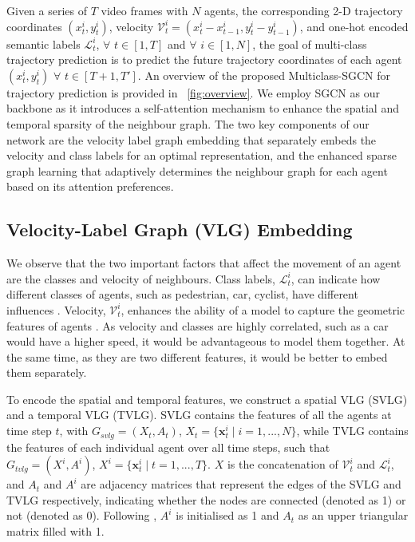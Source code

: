 \documentclass{article}
\begin{document}
Given a series of ${T}$ video frames with $N$ agents, the corresponding 2-D trajectory coordinates $(x_{t}^{i}, y_{t}^{i})$, velocity $\mathcal{V}_{t}^{i} = (x_{t}^{i} - x_{t-1}^{i}, y_{t}^{i} - y_{t-1}^{i})$, and one-hot encoded semantic labels $\mathcal{L}_{t}^{i}$, $\forall$ $t\in [1,T]$ and $\forall$ $i\in[1,N]$, the goal of multi-class trajectory prediction is to predict the future trajectory coordinates of each agent $(x_{t}^{i}, y_{t}^{i})$ $\forall$ $t\in [T+1,T']$. An overview of the proposed Multiclass-SGCN for trajectory prediction is provided in \figurename~\ref{fig:overview}. We employ SGCN \cite{shi2021sgcn} as our backbone as it introduces a self-attention mechanism to enhance the spatial and temporal sparsity of the neighbour graph. The two key components of our network are the velocity label graph embedding that separately embeds the velocity and class labels for an optimal representation, and the enhanced sparse graph learning that adaptively determines the neighbour graph for each agent based on its attention preferences.














\subsection{Velocity-Label Graph (VLG) Embedding}
\label{sec:embedding}
We observe that the two important factors that affect the movement of an agent are the classes and velocity of neighbours. Class labels, $\mathcal{L}_t^i$, can indicate how different classes of agents, such as pedestrian, car, cyclist, have different influences \cite{rainbow2021semanticsstgcnn}. Velocity, $\mathcal{V}_{t}^{i}$, enhances the ability of a model to capture the geometric features of agents \cite{Mohamed2020socialstgcnn}. As velocity and classes are highly correlated, such as a car would have a higher speed, it would be advantageous to model them together. At the same time, as they are two different features, it would be better to embed them separately.




To encode the spatial and temporal features, we construct a spatial VLG (SVLG) and a temporal VLG (TVLG). SVLG contains the features of all the agents at time step $t$, with $G_{svlg} = (X_t, A_{t})$, $X_{t} = \{ \mathbf{x}_{t}^{i} \mid i = 1,...,N\}$, while TVLG contains the features of each individual agent over all time steps, such that $G_{tvlg} = (X^{i}, A^{i})$, $X^{i} = \{ \mathbf{x}_{t}^{i} \mid t = 1,...,T\}$. $X$ is the concatenation of $\mathcal{V}_{t}^{i}$ and $\mathcal{L}_{t}^{i}$, and $A_{t}$ and $A^{i}$ are adjacency matrices that represent the edges of the SVLG and TVLG respectively, indicating whether the nodes are connected (denoted as 1) or not (denoted as 0). Following \cite{shi2021sgcn}, $A^i$ is initialised as 1 and $A_t$ as an upper triangular matrix filled with 1.
\end{document}
